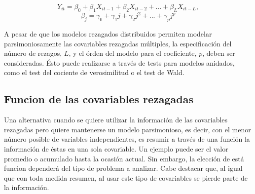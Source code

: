 \documentclass[spanish]{article}
\numberwithin{figure}{subsection}
\numberwithin{equation}{subsection}
\numberwithin{table}{subsection}
\begin{document}
\[ Y_{it} = \beta_0 + \beta_1 X_{it-1} + \beta_2 X_{it-2} + ... +
\beta_L X_{it-L}, \]
\[ \beta_j = \gamma_0 + \gamma_1 j + \gamma_2 j^2 + ... + \gamma_p j^p \]

A pesar de que los modelos rezagados distribuidos permiten modelar
parsimoniosamente las covariables rezagadas múltiples, la especificación del
número de rezagos, $L$, y el órden del modelo para el coeficiente, $p$, deben
ser consideradas. Ésto puede realizarse a través de tests para modelos
anidados, como el test del cociente de verosimilitud o el test de Wald.

\subsection{Funcion de las covariables rezagadas}

Una alternativa cuando se quiere utilizar la información de las covariables
rezagadas pero quiere mantenerse un modelo parsimonioso, es decir, con el menor
número posible de variables independientes, es resumir a través de una función
la información de éstas en una sola covariable. Un ejemplo puede ser el valor
promedio o acumulado hasta la ocasión actual. Sin embargo, la elección de está
funcion dependerá del tipo de problema a analizar. Cabe destacar que, al igual
que con toda medida resumen, al usar este tipo de covariables se pierde
parte de la información.



\end{document}
